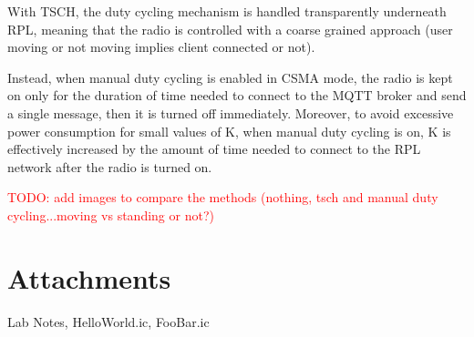 \documentclass[a4paper, 11pt]{article}
\begin{document}
With TSCH, the duty cycling mechanism is handled transparently underneath RPL, meaning that the radio is controlled with a coarse grained approach (user moving or not moving implies client connected or not).

Instead, when manual duty cycling is enabled in CSMA mode, the radio is kept on only for the duration of time needed to  connect to the MQTT broker and send a single message, then it is turned  off immediately.
Moreover, to avoid excessive power consumption for small values of K, when manual duty cycling is on, K is effectively increased by the amount of  time needed to connect to the RPL network after the radio is turned on.

\textcolor{red}{TODO: add images to compare the methods (nothing, tsch and manual duty cycling...moving vs standing or not?)}

\section*{Attachments}
Lab Notes, HelloWorld.ic, FooBar.ic
\end{document}
